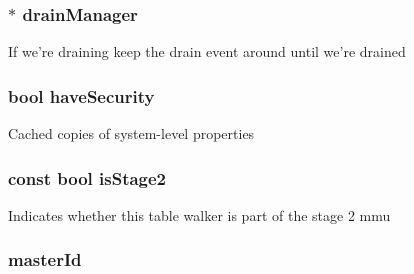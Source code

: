 \label{classArmISA_1_1TableWalker_ac0fab25a73916f1bf677990e67557b5a}
\hypertarget{classArmISA_1_1TableWalker_a329b71fb934a93312ca0aacbf5a3f982}{
\subsubsection[{drainManager}]{$\ast$ {\bf drainManager}}}
\label{classArmISA_1_1TableWalker_a329b71fb934a93312ca0aacbf5a3f982}
If we're draining keep the drain event around until we're drained \hypertarget{classArmISA_1_1TableWalker_a9f135583566fb70bba3c10395368f2e4}{
\subsubsection[{haveSecurity}]{\setlength{\rightskip}{0pt plus 5cm}bool {\bf haveSecurity}}}
\label{classArmISA_1_1TableWalker_a9f135583566fb70bba3c10395368f2e4}
Cached copies of system-\/level properties \hypertarget{classArmISA_1_1TableWalker_a475f8007920fb01f7f8aa1730b3016bb}{
\subsubsection[{isStage2}]{\setlength{\rightskip}{0pt plus 5cm}const bool {\bf isStage2}}}
\label{classArmISA_1_1TableWalker_a475f8007920fb01f7f8aa1730b3016bb}
Indicates whether this table walker is part of the stage 2 mmu \hypertarget{classArmISA_1_1TableWalker_a96ec6a422ac492d05f8b3edc5b58532b}{
\subsubsection[{masterId}]{ {\bf masterId}}}

